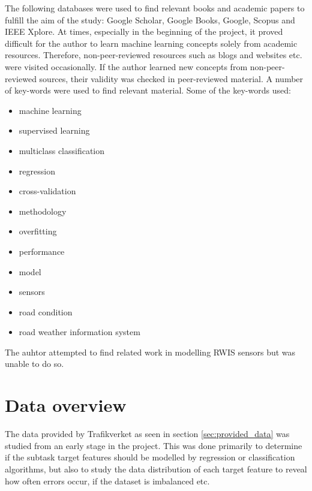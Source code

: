 	The following databases were used to find relevant books and academic papers to fulfill the aim of the study: Google Scholar, Google Books, Google, Scopus and IEEE Xplore. At times, especially in the beginning of the project, it proved difficult for the author to learn machine learning concepts solely from academic resources. Therefore, non-peer-reviewed resources such as blogs and websites etc. were visited occasionally. If the author learned new concepts from non-peer-reviewed sources, their validity was checked in peer-reviewed material. A number of key-words were used to find relevant material. Some of the key-words used:

	\begin{itemize}
		\item machine learning
		\item supervised learning
		\item multiclass classification
		\item regression
		\item cross-validation
		\item methodology
		\item overfitting
		\item performance
		\item model
		\item sensors
		\item road condition
		\item road weather information system
	\end{itemize}

	The auhtor attempted to find related work in modelling RWIS sensors but was unable to do so.

	
\section{Data overview} \label{sec:data_overview}
	The data provided by Trafikverket as seen in section \ref{sec:provided_data} was studied from an early stage in the project. This was done primarily to determine if the subtask target features should be modelled by regression or classification algorithms, but also to study the data distribution of each target feature to reveal how often errors occur, if the dataset is imbalanced etc. 

